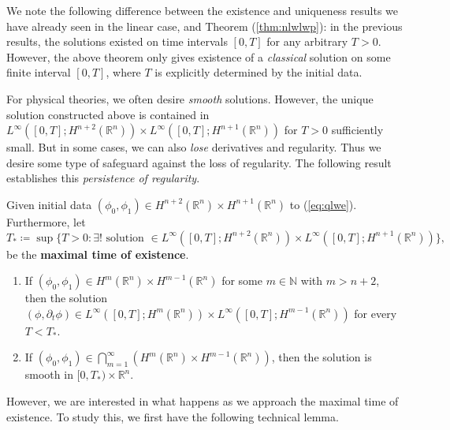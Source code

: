 \documentclass{article}
\begin{document}
We note the following difference between the existence and uniqueness results we have already seen in the linear case, and Theorem (\ref{thm:nlwlwp}): in the previous results, the solutions existed on time intervals $[0,T]$ for any arbitrary $T > 0$. However, the above theorem only gives existence of a \textit{classical} solution on some finite interval $[0,T]$, where $T$ is explicitly determined by the initial data. 

For physical theories, we often desire \textit{smooth} solutions. However, the unique solution constructed above is contained in $L^{\infty}([0,T]; H^{n + 2}(\mathbb{R}^{n})) \times L^{\infty}([0,T]; H^{n + 1}(\mathbb{R}^{n}))$ for $T > 0$ sufficiently small. But in some cases, we can also \textit{lose} derivatives and regularity. Thus we desire some type of safeguard against the loss of regularity. The following result establishes this \textit{persistence of regularity}. 

\begin{theorem}
	Given initial data $(\phi_{0}, \phi_{1}) \in H^{n + 2}(\mathbb{R}^{n}) \times H^{n + 1}(\mathbb{R}^{n})$ to (\ref{eq:qlwe}). Furthermore, let 
	\begin{equation}
		T_{\ast} \coloneqq \sup\{T > 0: \exists ! \text{ solution } \in L^{\infty}([0,T]; H^{n + 2}(\mathbb{R}^{n})) \times L^{\infty}([0,T]; H^{n + 1}(\mathbb{R}^{n}))\}, 
		\label{eq:maximal_time}
	\end{equation}
	be the \textbf{maximal time of existence}. \vspace{-0.25cm} 
	\begin{enumerate}[itemsep = -2pt,label = (\alph{*})]
		\item If $(\phi_{0}, \phi_{1}) \in H^{m}(\mathbb{R}^{n}) \times H^{m-1}(\mathbb{R}^{n})$ for some $m \in \mathbb{N}$ with $m > n +2$, then the solution $(\phi, \partial_{t}\phi) \in L^{\infty}([0,T]; H^{m}(\mathbb{R}^{n})) \times L^{\infty}([0,T]; H^{m-1}(\mathbb{R}^{n}))$ for every $T < T_{\ast}$. 
		\item If $(\phi_{0}, \phi_{1}) \in \bigcap_{m = 1}^{\infty}(H^{m}(\mathbb{R}^{n}) \times H^{m - 1}(\mathbb{R}^{n}))$, then the solution is smooth in $[0, T_{\ast}) \times \mathbb{R}^{n}$. 
	\end{enumerate}
\end{theorem} 

However, we are interested in what happens as we approach the maximal time of existence. To study this, we first have the following technical lemma. 
\end{document}
